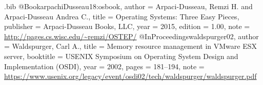 \usepackage{filecontents}
\usepackage{tikz}
\usepackage{amsmath}
\usepackage{xurl} 
\usepackage{amsfonts}
\usepackage{ifthen}
\usepackage{shadow}
\usepackage{hhline}
\usepackage{tabularx}
\usepackage{fancyhdr}
\usepackage{etoolbox}
\usepackage[T1]{fontenc}
\usepackage{textcomp}
\usepackage{enumitem}
\usepackage{color}
\usepackage{colortbl}
\usepackage{enumitem}
\usepackage{cancel}
\usepackage{bbding}
\usepackage{booktabs}
\usepackage{multirow}
\usepackage{tabularx}
\usepackage{xcolor}
\usepackage{fontawesome5}
\usepackage{lipsum}
\usepackage{subcaption}
\usepackage{makecell}

\begin{filecontents}{\jobname.bib}
@Book{arpachiDusseau18:osbook,
  author =       {Arpaci-Dusseau, Remzi H. and Arpaci-Dusseau Andrea C.},
  title =        {Operating Systems: Three Easy Pieces},
  publisher =    {Arpaci-Dusseau Books, LLC},
  year =         2015,
  edition =      {1.00},
  note =         {\url{http://pages.cs.wisc.edu/~remzi/OSTEP/}}
}
@InProceedings{waldspurger02,
  author =       {Waldspurger, Carl A.},
  title =        {Memory resource management in {VMware ESX} server},
  booktitle =    {USENIX Symposium on Operating System Design and
                  Implementation (OSDI)},
  year =         2002,
  pages =        {181--194},
  note =         {\url{https://www.usenix.org/legacy/event/osdi02/tech/waldspurger/waldspurger.pdf}}}
\end{filecontents}

\newcommand*\STAIF[0]{VAIF} %
\newcommand*\staif[0]{VAIF} %

\newenvironment{mycomment}{\begin{quote}\itshape\faComment\quad}{\end{quote}}



